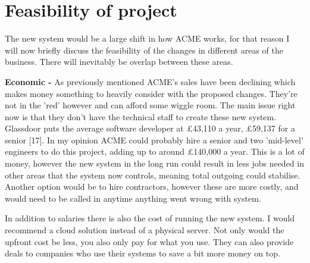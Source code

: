 \section{Feasibility of project}
  The new system would be a large shift in how ACME works, for that reason I will now briefly discuss the feasibility of the changes in different areas
  of the business. There will inevitably be overlap between these areas.
  \vspace{0.2cm}

  \noindent\textbf{Economic -} As previously mentioned ACME's sales have been declining which makes money something to heavily consider with the proposed
  changes. They're not in the 'red' however and can afford some wiggle room. The main issue right now is that they don't have the technical staff to create 
  these new system. Glassdoor puts the average software developer at £43,110 a year, £59,137 for a senior [17]. In my opinion ACME could probably hire a senior and
  two 'mid-level' engineers to do this project, adding up to around £140,000 a year. This is a lot of money, however the new system in the long run could result
  in less jobs needed in other areas that the system now controls, meaning total outgoing could stabilise. Another option would be to hire contractors, however
  these are more costly, and would need to be called in anytime anything went wrong with system.
  
  In addition to salaries there is also the cost of running the new system. I would recommend a cloud solution instead of a physical server. Not only would the
  upfront cost be less, you also only pay for what you use. They can also provide deals to companies who use their systems to save a bit more money on top.
  
  \vspace{0.2cm}

